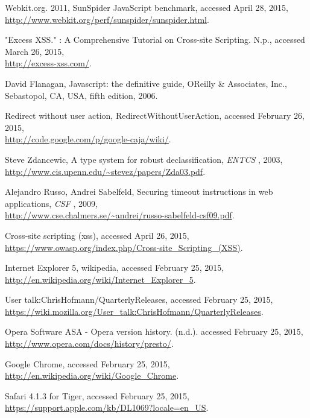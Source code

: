 \begin{thebibliography}{10}
 Webkit.org. 2011, SunSpider JavaScript benchmark, accessed April 28, 2015, \\ \url{http://www.webkit.org/perf/sunspider/sunspider.html}.

"Excess XSS." : A Comprehensive Tutorial on Cross-site Scripting. N.p., accessed March 26, 2015, \\
\url{http://excess-xss.com/}.

 David Flanagan, Javascript: the definitive guide, O\textquotesingle Reilly \& Associates, Inc., Sebastopol, CA, USA, fifth edition, 2006.

 Redirect without user action, RedirectWithoutUserAction, accessed February 26, 2015,\\
\url{http://code.google.com/p/google-caja/wiki/}.

 Steve Zdancewic, A type system for robust declassification, {\it ENTCS }, 2003, \\
\url{http://www.cis.upenn.edu/~stevez/papers/Zda03.pdf}.

 Alejandro Russo, Andrei Sabelfeld, Securing timeout instructions in web applications, { \it  CSF }, 2009, \\
\url{http://www.cse.chalmers.se/~andrei/russo-sabelfeld-csf09.pdf}.

 Cross-site scripting (xss), accessed April 26, 2015, \\
\url{https://www.owasp.org/index.php/Cross-site_Scripting_(XSS)}.

 Internet Explorer 5, wikipedia, accessed February 25, 2015, \\ \url{http://en.wikipedia.org/wiki/Internet_Explorer_5}.

 User talk:ChrisHofmann/QuarterlyReleases, accessed February 25, 2015, \\ \url{https://wiki.mozilla.org/User_talk:ChrisHofmann/QuarterlyReleases}.

 Opera Software ASA - Opera version history. (n.d.). accessed February 25, 2015, \\ \url{http://www.opera.com/docs/history/presto/}.

 Google Chrome, accessed February 25, 2015, \\
\url{http://en.wikipedia.org/wiki/Google_Chrome}.

 Safari 4.1.3 for Tiger, accessed February 25, 2015, \\ 
\url{https://support.apple.com/kb/DL1069?locale=en_US}.

\end{thebibliography}
